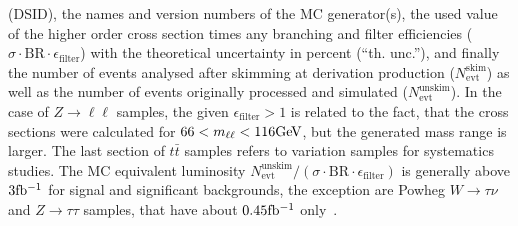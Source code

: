 \begin{table}[htbp]
\begin{center}
{    			(DSID), the names and version numbers of the MC generator(s),
    			the used value of the higher order cross section times
    			any branching and filter efficiencies ($\sigma{\cdot}
    			\text{BR}{\cdot}\epsilon_\mathrm{filter}$) with the
    			theoretical uncertainty in percent (``th. unc.''),
    			and finally the number of events analysed
    			after skimming at derivation production
    			($N^\mathrm{skim}_\mathrm{evt}$) as well as the number of events
    			originally processed and simulated
    			($N^\mathrm{unskim}_\mathrm{evt}$). In the case of
    			$Z\to\ell\ell$ samples, the given $\epsilon_\mathrm{filter} > 1$
    			is related to the fact, that the cross sections were calculated
    			for $66 <m_{\ell\ell} <116\text{Ge\kern -0.1em V}$, but the generated mass range is
    			larger. The last section of $t\bar{t}$ samples refers to
    			variation samples for systematics studies. The MC equivalent
    			luminosity
    			$N^\mathrm{unskim}_\mathrm{evt}/(\sigma{\cdot}\text{BR}{\cdot}\epsilon_\mathrm{filter})$
    			is generally above $3\mbox{fb\(^{-1}\)}$ for signal and significant
    			backgrounds, the exception are Powheg $W\to\tau\nu$ and
    			$Z\to\tau\tau$ samples, that have about $0.45\mbox{fb\(^{-1}\)}$ only~\cite{int_note_samples}.}
    		\label{tab:samples13}
    	\end{center}
    \end{table}
    
